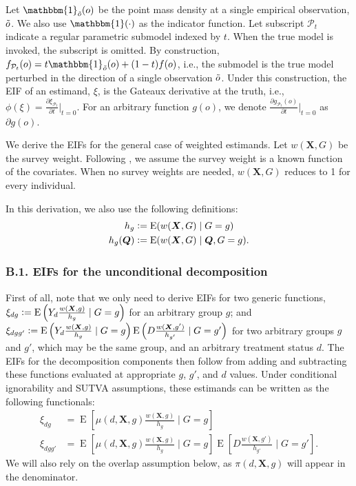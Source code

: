 \documentclass[12pt,a4paper]{article}
\newcommand{\E}{\operatorname{E}}
\def\X{{\boldsymbol X}}
\def\Q{{\boldsymbol Q}}
\def\one{\mathbbm{1}}
\newcommand{\defeq}{\vcentcolon=}
\begin{document}
Let $\one_{\Tilde{o}}(o)$ be the point mass density at a single empirical observation,  $\Tilde{o}$. We also use $\one(\cdot)$ as the indicator function. Let subscript $\mathcal{P}_t$ indicate a regular parametric submodel indexed by $t$. When the true model is invoked, the subscript is omitted. By construction, $f_{\mathcal{P}_t}(o)=t \one_{\Tilde{o}}(o) + (1-t)f(o)$, i.e., the submodel is the true model perturbed in the direction of a single observation $\Tilde{o}$. Under this construction, the EIF of an estimand, $\xi$, is the Gateaux derivative at the truth, i.e., $\phi(\xi)=\frac{\partial \xi_{\mathcal{P}_t}}{\partial t} \big|_{t=0}$. For an arbitrary function $g(o)$, we denote $ \frac{\partial g_{\mathcal{P}_t}(o)}{\partial t} \big|_{t=0}$ as $\partial g(o)$. 

We derive the EIFs for the general case of  weighted estimands. Let $w(\X,  G)$ be the  survey weight. Following \citet{hirano_efficient_2003}, we assume the survey weight is a known function of the covariates. When no survey weights are needed, $w(\X, G)$ reduces to 1 for every individual.

In this derivation, we also use the following definitions:
\begin{align*}
    h_g & \defeq \E(w(\X,  G) \mid G=g) \\
    h_g(\Q) & \defeq \E(w(\X,  G) \mid \Q, G=g).
\end{align*}

\subsubsection*{B.1. EIFs for the unconditional decomposition}
First of all, note that we only need to derive EIFs for two generic functions, $\xi_{dg} \defeq \E \left(Y_d \frac{ w(\X,g)}{h_g} \mid G=g  \right)$ for an arbitrary group $g$; and $\xi_{dgg'} \defeq \E \left(Y_d \frac{ w(\X,g)}{h_g} \mid G=g \right)\E \left(D \frac{ w(\X,g')}{h_{g'}}  \mid G=g' \right)$ for two arbitrary groups $g$ and $g'$, which may be the same group, and an arbitrary treatment status $d$. The EIFs for the decomposition components then follow from adding and subtracting these functions evaluated at appropriate $g$, $g'$, and $d$ values. Under conditional ignorability and SUTVA assumptions, these estimands can be written as the following functionals:
\begin{align*}
    \xi_{dg} &= \E \left[\mu(d,\X,g) \frac{ w(\X,g)}{h_g} \mid G=g \right] \\
    \xi_{dgg'} &= \E \left[\mu(d,\X,g) \frac{ w(\X,g)}{h_g} \mid G=g \right] \E \left[D \frac{ w(\X,g')}{h_{g'}}  \mid G=g' \right].
\end{align*}
We will also rely on the overlap assumption below, as $\pi(d,\X,g)$ will appear in the denominator.
\end{document}
